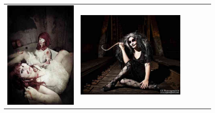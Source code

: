 \begin{figure}
\begin{tabular}{m{.01\linewidth} m{.16\linewidth} m{.16\linewidth} m{.16\linewidth} m{.16\linewidth} m{.16\linewidth}}
    \includegraphics[width=\linewidth]{../style/figures/flickr_on_flickr/pred_style_Horror/1.jpg} &
    \includegraphics[width=\linewidth]{../style/figures/flickr_on_flickr/pred_style_Horror/2.jpg} &

\end{tabular}
\end{figure}

